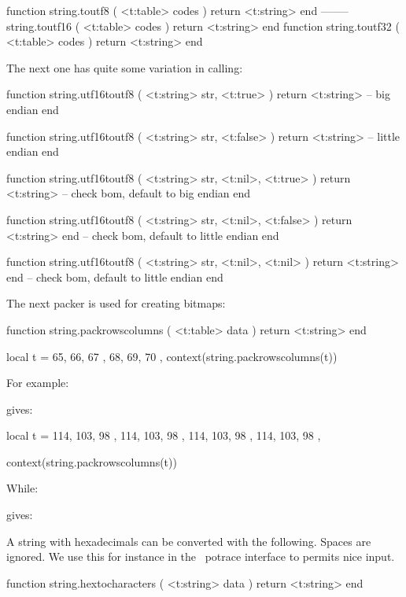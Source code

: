 \starttyping[option=LUA]
function string.toutf8  ( <t:table>   codes ) return <t:string> end
-------- string.toutf16 ( <t:table>   codes ) return <t:string> end
function string.toutf32 ( <t:table>   codes ) return <t:string> end
\stoptyping

The next one has quite some variation in calling:

\starttyping[option=LUA]
function string.utf16toutf8 ( <t:string> str, <t:true> )
    return <t:string>  -- big endian
end
\stoptyping

\starttyping[option=LUA]
function string.utf16toutf8 ( <t:string> str, <t:false> )
    return <t:string> -- little endian
end
\stoptyping

\starttyping[option=LUA]
function string.utf16toutf8 ( <t:string> str, <t:nil>, <t:true> )
    return <t:string> -- check bom, default to big endian
end
\stoptyping

\starttyping[option=LUA]
function string.utf16toutf8 ( <t:string> str, <t:nil>, <t:false> )
    return <t:string> end -- check bom, default to little endian
end
\stoptyping

\starttyping[option=LUA]
function string.utf16toutf8 ( <t:string> str, <t:nil>, <t:nil> )
    return <t:string> end -- check bom, default to little endian
end
\stoptyping

The next packer is used for creating bitmaps:

\starttyping[option=LUA]
function string.packrowscolumns ( <t:table> data )
    return <t:string>
end
\stoptyping

\startbuffer
\startluacode
local t = {
    { 65, 66, 67 },
    { 68, 69, 70 },
}
context(string.packrowscolumns(t))
\stopluacode
\stopbuffer

For example:

\typebuffer

gives: \inlinebuffer

\startbuffer
\startluacode
local t = {
    { { 114, 103, 98 }, { 114, 103, 98 } },
    { { 114, 103, 98 }, { 114, 103, 98 } },
}

context(string.packrowscolumns(t))
\stopluacode
\stopbuffer

While:

\typebuffer

gives: \inlinebuffer

A string with hexadecimals can be converted with the following. Spaces are
ignored. We use this for instance in the \METAPOST\ potrace interface to
permits nice input.

\starttyping[option=LUA]
function string.hextocharacters ( <t:string> data )
    return <t:string>
end
\stoptyping

